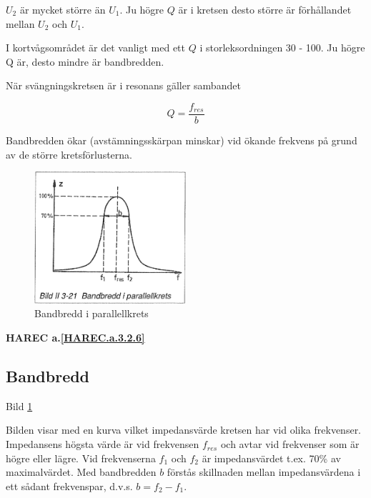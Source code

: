 \(U_2\) är mycket större än \(U_1\). Ju högre \(Q\) är i kretsen desto större är
förhållandet mellan \(U_2\) och \(U_1\).

I kortvågsområdet är det vanligt med ett \(Q\) i storleksordningen 30 - 100.
Ju högre Q är, desto mindre är bandbredden.

När svängningskretsen är i resonans gäller sambandet

\[Q = \frac{f_{res}}{b}\]

Bandbredden ökar (avstämningsskärpan minskar) vid ökande frekvens på grund av de
större kretsförlusterna.

\begin{figure}
\includegraphics[width=0.5\textwidth]{images/bild_2_3-21}
\caption{Bandbredd i parallellkrets}
\label{fig:BildII3-21}
\end{figure}

\textbf{HAREC a.\ref{HAREC.a.3.2.6}\label{myHAREC.a.3.2.6}}

\subsection{Bandbredd}

Bild \ref{fig:BildII3-21}

Bilden visar med en kurva vilket impedansvärde kretsen har vid olika frekvenser.
Impedansens högsta värde är vid frekvensen \(f_{res}\) och avtar vid frekvenser
som är högre eller lägre. Vid frekvenserna \(f_1\) och \(f_2\) är
impedansvärdet t.ex. 70\% av maximalvärdet. Med bandbredden \(b\) förstås
skillnaden mellan impedansvärdena i ett sådant frekvenspar, d.v.s.
\(b = f_2 - f_1\).
